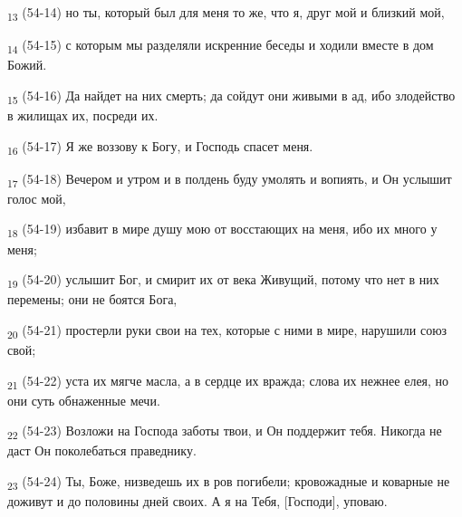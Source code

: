 \begin{tcolorbox}
\textsubscript{13} (54-14) но ты, который был для меня то же, что я, друг мой и близкий мой,
\end{tcolorbox}
\begin{tcolorbox}
\textsubscript{14} (54-15) с которым мы разделяли искренние беседы и ходили вместе в дом Божий.
\end{tcolorbox}
\begin{tcolorbox}
\textsubscript{15} (54-16) Да найдет на них смерть; да сойдут они живыми в ад, ибо злодейство в жилищах их, посреди их.
\end{tcolorbox}
\begin{tcolorbox}
\textsubscript{16} (54-17) Я же воззову к Богу, и Господь спасет меня.
\end{tcolorbox}
\begin{tcolorbox}
\textsubscript{17} (54-18) Вечером и утром и в полдень буду умолять и вопиять, и Он услышит голос мой,
\end{tcolorbox}
\begin{tcolorbox}
\textsubscript{18} (54-19) избавит в мире душу мою от восстающих на меня, ибо их много у меня;
\end{tcolorbox}
\begin{tcolorbox}
\textsubscript{19} (54-20) услышит Бог, и смирит их от века Живущий, потому что нет в них перемены; они не боятся Бога,
\end{tcolorbox}
\begin{tcolorbox}
\textsubscript{20} (54-21) простерли руки свои на тех, которые с ними в мире, нарушили союз свой;
\end{tcolorbox}
\begin{tcolorbox}
\textsubscript{21} (54-22) уста их мягче масла, а в сердце их вражда; слова их нежнее елея, но они суть обнаженные мечи.
\end{tcolorbox}
\begin{tcolorbox}
\textsubscript{22} (54-23) Возложи на Господа заботы твои, и Он поддержит тебя. Никогда не даст Он поколебаться праведнику.
\end{tcolorbox}
\begin{tcolorbox}
\textsubscript{23} (54-24) Ты, Боже, низведешь их в ров погибели; кровожадные и коварные не доживут и до половины дней своих. А я на Тебя, [Господи], уповаю.
\end{tcolorbox}
